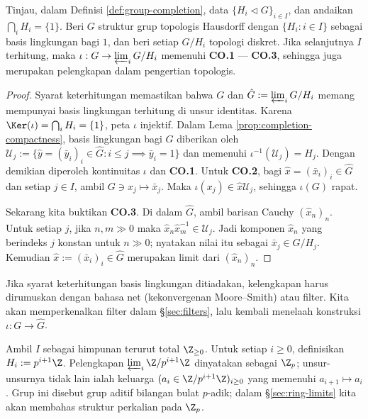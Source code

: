 \begin{theorem}
	Tinjau, dalam Definisi \ref{def:group-completion}, data $\{ H_i \lhd G \}_{i \in I}$, dan andaikan $\bigcap_i H_i = \{1\}$. Beri $G$ struktur grup topologis Hausdorff dengan $\{H_i : i \in I \}$ sebagai basis lingkungan bagi $1$, dan beri setiap $G/H_i$ topologi diskret. Jika selanjutnya $I$ terhitung, maka $\iota: G \to \varprojlim_i G/H_i$ memenuhi \textbf{CO.1} --- \textbf{CO.3}, sehingga juga merupakan pelengkapan dalam pengertian topologis.
\end{theorem}
\begin{proof}
	Syarat keterhitungan memastikan bahwa $G$ dan $\hat{G} := \varprojlim_i G/H_i$ memang mempunyai basis lingkungan terhitung di unsur identitas. Karena $\Ker(\iota) = \bigcap_i H_i = \{1\}$, peta $\iota$ injektif. Dalam Lema \ref{prop:completion-compactness}, basis lingkungan bagi $\hat{G}$ diberikan oleh $\mathcal{U}_j := \{ \hat{y}=(\bar{y}_i)_i \in \hat{G}: i \leq j \implies \bar{y}_i = 1 \}$ dan memenuhi $\iota^{-1}(\mathcal{U}_j) = H_j$. Dengan demikian diperoleh kontinuitas $\iota$ dan \textbf{CO.1}. Untuk \textbf{CO.2}, bagi $\hat{x} = (\bar{x}_i)_i \in \hat{G}$ dan setiap $j \in I$, ambil $G \ni x_j \mapsto \bar{x}_j$. Maka $\iota(x_j) \in \hat{x}\mathcal{U}_j$, sehingga $\iota(G)$ rapat.
	
	Sekarang kita buktikan \textbf{CO.3}. Di dalam $\hat{G}$, ambil barisan Cauchy $(\hat{x}_n)_n$. Untuk setiap $j$, jika $n,m \gg 0$ maka $\hat{x}_n \hat{x}_m^{-1} \in \mathcal{U}_j$. Jadi komponen $\hat{x}_n$ yang berindeks $j$ konstan untuk $n \gg 0$; nyatakan nilai itu sebagai $\bar{x}_j \in G/H_j$. Kemudian $\hat{x} := (\bar{x}_i)_i \in \hat{G}$ merupakan limit dari $(\hat{x}_n)_n$.
\end{proof}

\begin{remark}
	Jika syarat keterhitungan basis lingkungan ditiadakan, kelengkapan harus dirumuskan dengan bahasa net (kekonvergenan Moore--Smith) atau filter. Kita akan memperkenalkan filter dalam \S\ref{sec:filters}, lalu kembali menelaah konstruksi $\iota: G \to \hat{G}$.
\end{remark}

\begin{example}\label{eg:p-adic}
	Ambil $I$ sebagai himpunan terurut total $\Z_{\geq 0}$. Untuk setiap $i \geq 0$, definisikan $H_i := p^{i+1} \Z$. Pelengkapan $\varprojlim_i \Z/p^{i+1} \Z$ dinyatakan sebagai $\Z_p$; unsur-unsurnya tidak lain ialah keluarga $(a_i \in \Z/p^{i+1} \Z)_{i \geq 0}$ yang memenuhi $a_{i+1} \mapsto a_i$. Grup ini disebut grup aditif bilangan bulat $p$-adik; dalam \S\ref{sec:ring-limits} kita akan membahas struktur perkalian pada $\Z_p$.
\end{example}

